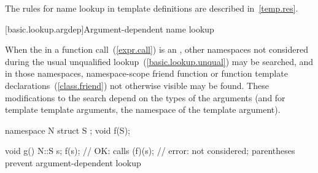 \pnum
\begin{note} The rules for name lookup in template definitions are
described in~\ref{temp.res}. \end{note}

[basic.lookup.argdep]{Argument-dependent name lookup}%

\pnum
When the  in
a function call~(\ref{expr.call}) is an , other namespaces not considered
during the usual unqualified lookup~(\ref{basic.lookup.unqual}) may be
searched, and in those namespaces, namespace-scope friend function or
function template declarations~(\ref{class.friend}) not otherwise
visible may be found.
These modifications to the search depend on the types of the arguments
(and for template template arguments, the namespace of the template
argument).
\begin{example}
\begin{codeblock}
namespace N {
  struct S { };
  void f(S);
}

void g() {
  N::S s;
  f(s);             // OK: calls 
  (f)(s);           // error:  not considered; parentheses prevent argument-dependent lookup
}
\end{codeblock}
\end{example}

